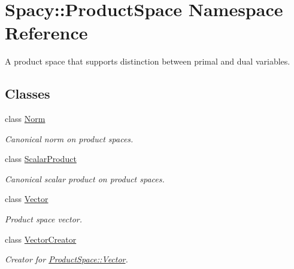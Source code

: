 \hypertarget{namespaceSpacy_1_1ProductSpace}{}\section{Spacy\+:\+:Product\+Space Namespace Reference}
\label{namespaceSpacy_1_1ProductSpace}


A product space that supports distinction between primal and dual variables.  


\subsection*{Classes}
\begin{DoxyCompactItemize}
\item 
class \hyperlink{classSpacy_1_1ProductSpace_1_1Norm}{Norm}
\begin{DoxyCompactList}\small\item\em Canonical norm on product spaces. \end{DoxyCompactList}\item 
class \hyperlink{classSpacy_1_1ProductSpace_1_1ScalarProduct}{Scalar\+Product}
\begin{DoxyCompactList}\small\item\em Canonical scalar product on product spaces. \end{DoxyCompactList}\item 
class \hyperlink{classSpacy_1_1ProductSpace_1_1Vector}{Vector}
\begin{DoxyCompactList}\small\item\em Product space vector. \end{DoxyCompactList}\item 
class \hyperlink{classSpacy_1_1ProductSpace_1_1VectorCreator}{Vector\+Creator}
\begin{DoxyCompactList}\small\item\em Creator for \hyperlink{classSpacy_1_1ProductSpace_1_1Vector}{Product\+Space\+::\+Vector}. \end{DoxyCompactList}\end{DoxyCompactItemize}
